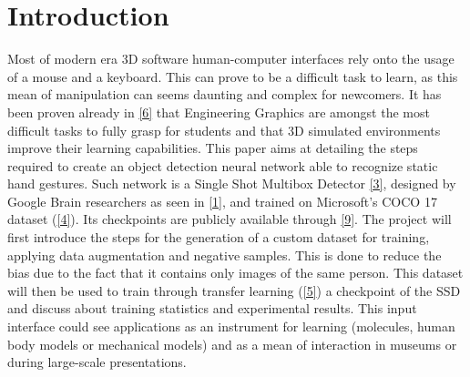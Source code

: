 \documentclass[a4paper, 12pt]{article}
\begin{document}
\section{Introduction}
\begin{flushleft}
Most of modern era 3D software human-computer interfaces rely onto the usage of a mouse and a keyboard. This can prove to be a difficult task to learn, as this mean of manipulation can seems daunting and complex for newcomers.\linebreak
It has been proven already in \hyperref[Ref4]{[6]} that Engineering Graphics are amongst the most difficult tasks to fully grasp for students and that 3D simulated environments improve their learning capabilities.\linebreak
This paper aims at detailing the steps required to create an object detection neural network able to recognize static hand gestures. Such network is a Single Shot Multibox Detector \hyperref[Ref1]{[3]}, designed by Google Brain researchers as seen in \hyperref[RefSSD]{[1]}, and trained on Microsoft's COCO 17 dataset (\hyperref[Ref2]{[4]}). Its checkpoints are publicly available through \hyperref[Ref10]{[9]}.\linebreak
The project will first introduce the steps for the generation of a custom dataset for training, applying data augmentation and negative samples. This is done to reduce the bias due to the fact that it contains only images of the same person. This dataset will then be used to train through transfer learning (\hyperref[Ref3]{[5]}) a checkpoint of the SSD and discuss about training statistics and experimental results.\linebreak
This input interface could see applications as an instrument for learning (molecules, human body models or mechanical models) and as a mean of interaction in museums or during large-scale presentations.\linebreak
\end{flushleft}
\end{document}
